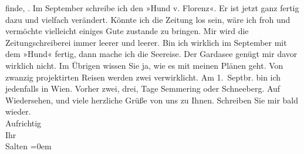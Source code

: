 \begin{ledgroupsized}[t]{13cm}
               finde, \label{K_L03510-3v}\label{K_L03510-3h}. Im September schreibe ich den »Hund v. Florenz«. Er ist jetzt ganz fertig dazu
               und vielfach verändert. Könnte ich die Zeitung los sein, wäre ich froh und vermöchte
               vielleicht einiges Gute zustande zu bringen. Mir wird die Zeitungschreiberei immer
               leerer und leerer. Bin ich wirklich im September mit dem
                  »Hund« fertig, dann mache ich die Seereise.
               Der Gardasee genügt mir davor wirklich nicht.
               Im Übrigen wissen Sie ja, wie es mit meinen Plänen geht. Von zwanzig projektirten
               Reisen werden zwei verwirklicht. Am 1. Septbr. bin ich
               jedenfalls in Wien. Vorher zwei, drei, Tage Semmering oder Schneeberg.\pend
           \pstart
           Auf Wiedersehen, und viele herzliche Grüße von uns zu Ihnen. Schreiben Sie mir bald
               wieder. {\\[\baselineskip]}Aufrichtig {\\[\baselineskip]}Ihr {\\[\baselineskip]}\spacefill\mbox{Salten}\pend
           \leftskip=0em{}\pstart

\end{ledgroupsized}
